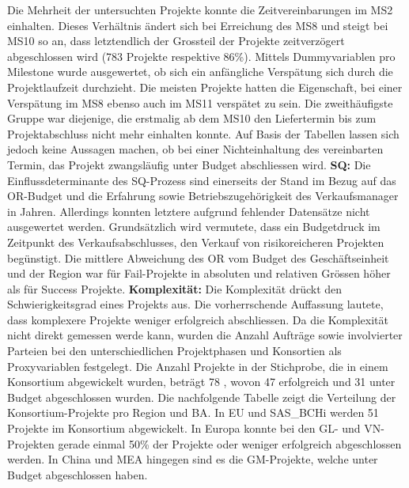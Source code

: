 Die Mehrheit der untersuchten Projekte konnte die Zeitvereinbarungen im MS2 einhalten. Dieses Verhältnis ändert sich bei Erreichung des MS8 und steigt bei MS10 so an, dass letztendlich der Grossteil der Projekte zeitverzögert abgeschlossen wird (783 Projekte respektive 86\%). Mittels Dummyvariablen pro Milestone wurde ausgewertet, ob sich ein anfängliche Verspätung sich durch die Projektlaufzeit durchzieht. Die meisten Projekte hatten die Eigenschaft, bei einer Verspätung im MS8 ebenso auch im MS11 verspätet zu sein. Die zweithäufigste Gruppe war diejenige, die erstmalig ab dem MS10 den Liefertermin bis zum Projektabschluss nicht mehr einhalten konnte. Auf Basis der Tabellen lassen sich jedoch keine Aussagen machen, ob bei einer Nichteinhaltung des vereinbarten Termin, das Projekt zwangsläufig unter Budget abschliessen wird. 
\newline\newline\textbf{SQ:} Die Einflussdeterminante des SQ-Prozess sind einerseits der Stand im Bezug auf das OR-Budget und die Erfahrung sowie Betriebszugehörigkeit des Verkaufsmanager in Jahren. Allerdings konnten letztere aufgrund fehlender Datensätze nicht ausgewertet werden. Grundsätzlich wird vermutete, dass ein Budgetdruck im Zeitpunkt des Verkaufsabschlusses, den Verkauf von risikoreicheren Projekten begünstigt. Die mittlere Abweichung des OR vom Budget des Geschäftseinheit und der Region war für Fail-Projekte in absoluten und relativen Grössen höher als für Success Projekte.  
\newline\newline\textbf{Komplexität:} Die Komplexität drückt den Schwierigkeitsgrad eines Projekts aus. Die vorherrschende Auffassung lautete, dass komplexere Projekte weniger erfolgreich abschliessen. Da die Komplexität nicht direkt gemessen werde kann, wurden die Anzahl Aufträge sowie involvierter Parteien bei den unterschiedlichen Projektphasen und Konsortien als Proxyvariablen festgelegt. Die Anzahl Projekte in der Stichprobe, die in einem Konsortium abgewickelt wurden, beträgt 78 , wovon 47 erfolgreich und 31 unter Budget abgeschlossen wurden. Die nachfolgende Tabelle zeigt die Verteilung der Konsortium-Projekte pro Region und BA. In EU und SAS\_BCHi werden 51 Projekte im Konsortium abgewickelt. In Europa konnte bei den GL- und VN-Projekten gerade einmal 50\% der Projekte oder weniger erfolgreich abgeschlossen werden. In China und MEA hingegen sind es die GM-Projekte, welche unter Budget abgeschlossen haben. 
